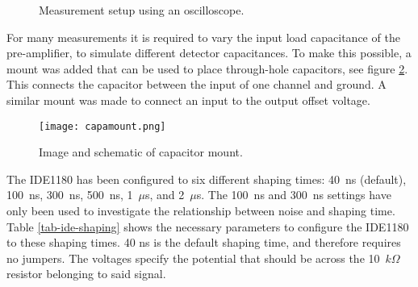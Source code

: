 \documentclass[../main/thesis.tex]{subfiles}
\begin{document}
\begin{figure}
	\centering
	\caption{Measurement setup using an oscilloscope.}
	\label{fig-setup-scope}
\end{figure}

For many measurements it is required to vary the input load capacitance of the pre-amplifier, to simulate different detector capacitances. To make this possible, a mount was added that can be used to place through-hole capacitors, see figure \ref{fig-capmount}. This connects the capacitor between the input of one channel and ground. A similar mount was made to connect an input to the output offset voltage.

\begin{figure}%
	\centering
	\texttt{[image: capamount.png]}
	\caption{Image and schematic of capacitor mount. \citep{Thomas} \citep{IDE1180sch}}
	\label{fig-capmount}
\end{figure} 

The IDE1180 has been configured to six different shaping times: 40~ns (default), 100~ns, 300~ns, 500~ns, 1~$\mu$s, and 2~$\mu$s. The 100~ns and 300~ns settings have only been used to investigate the relationship between noise and shaping time. Table \ref{tab-ide-shaping} shows the necessary parameters to configure the IDE1180 to these shaping times. 40 ns is the default shaping time, and therefore requires no jumpers. The voltages specify the potential that should be across the 10~$k\Omega$ resistor belonging to said signal.  
\end{document}
